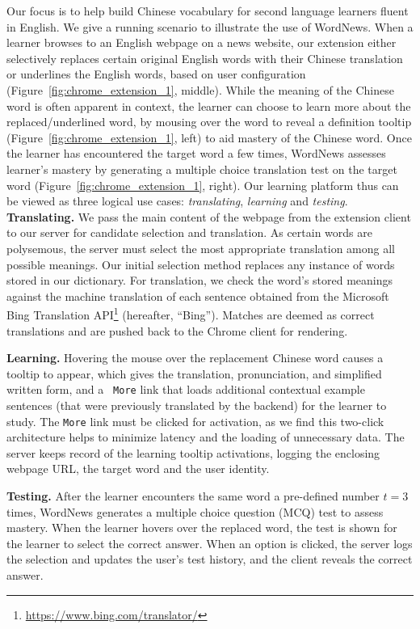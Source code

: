 \begin{CJK}{UTF8}{gbsn}
Our focus is to help build Chinese vocabulary for second language
learners fluent in English.  We give a running scenario to illustrate
the use of WordNews.  When a learner browses to an English webpage on
a news website, our extension either selectively replaces certain
original English words with their Chinese translation
or underlines the English words, based on user configuration
(Figure~\ref{fig:chrome_extension_1}, middle).  While the meaning of
the Chinese word is often apparent in context, the learner can choose
to learn more about the replaced/underlined word, by mousing over the
word to reveal a definition tooltip
(Figure~\ref{fig:chrome_extension_1}, left) to aid mastery of the
Chinese word.  Once the learner has encountered the target word a few
times, WordNews assesses learner's mastery by generating a multiple
choice translation test on the target word
(Figure~\ref{fig:chrome_extension_1}, right). Our learning platform
thus can be viewed as three logical use cases: {\it translating}, {\it
  learning} and {\it testing}. \\

{\bf Translating.}  We pass the main content of the webpage from the
extension client to our server for candidate selection and
translation.  As certain words are polysemous, the server must select
the most appropriate translation among all possible meanings. Our
initial selection method replaces any instance of words stored in our
dictionary. For translation, we check the word's stored meanings
against the machine translation of each sentence obtained from the
Microsoft Bing Translation API\footnote{\url{https://www.bing.com/translator/}} 
(hereafter, ``Bing'').  Matches are
deemed as correct translations and are pushed back to the Chrome
client for rendering.

{\bf Learning.} Hovering the mouse over the replacement Chinese word
causes a tooltip to appear, which gives the translation,
pronunciation, and simplified written form, and a {\tt
  More} link that loads additional contextual example sentences (that
were previously translated by the backend) for the learner to study.
The  {\tt More}  link must be clicked for activation, as we find this
two-click architecture helps to minimize latency and the loading of
unnecessary data.  The server keeps record of the learning tooltip
activations, logging the enclosing webpage URL, the target word and
the user identity.

{\bf Testing.}  After the learner encounters the same word a
pre-defined number $t=3$ times, WordNews generates a multiple choice
question (MCQ) test to assess mastery.  When the learner hovers over
the replaced word, the test is shown for the learner to select the
correct answer. When an option is clicked, the server logs the
selection and updates the user's test history, and the client reveals
the correct answer.


\end{CJK}
